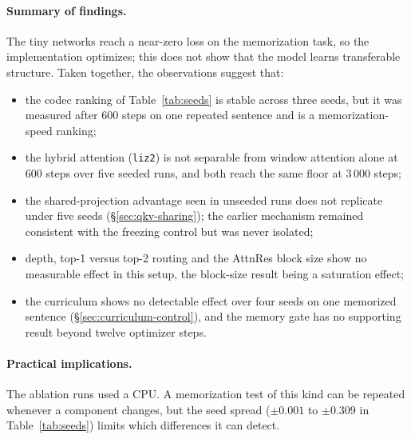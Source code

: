 \documentclass[11pt]{article}
\begin{document}
\paragraph{Summary of findings.} The tiny networks reach a near-zero loss on the
memorization task, so the implementation optimizes; this does not show that the model
learns transferable structure. Taken together, the observations suggest that:
\begin{itemize}
  \item the codec ranking of Table~\ref{tab:seeds} is stable across three seeds, but it was
        measured after 600 steps on one repeated sentence and is a memorization-speed ranking;
  \item the hybrid attention (\texttt{liz2}) is not separable from window attention alone at 600 steps
        over five seeded runs, and both reach the same floor at 3\,000 steps;
  \item the shared-projection advantage seen in unseeded runs does not replicate under five seeds
        (\S\ref{sec:qkv-sharing}); the earlier mechanism remained consistent with the freezing control but was never isolated;
  \item depth, top-1 versus top-2 routing and the AttnRes block size show no measurable
        effect in this setup, the block-size result being a saturation effect;
  \item the curriculum shows no detectable effect over four seeds on one memorized sentence
        (\S\ref{sec:curriculum-control}), and the memory gate has no supporting result beyond twelve
        optimizer steps.
\end{itemize}

\paragraph{Practical implications.} The ablation runs used a CPU. A memorization test of this
kind can be repeated whenever a component changes, but the seed spread ($\pm0.001$ to
$\pm0.309$ in Table~\ref{tab:seeds}) limits which differences it can detect.
\end{document}
